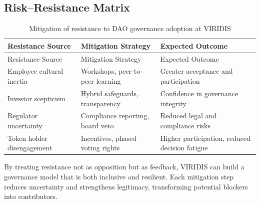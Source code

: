 \documentclass[
  english,
  12pt,
  oneside,
  open=any]{scrbook}
\begin{document}
\subsection{Risk--Resistance Matrix}\label{riskresistance-matrix}

\begin{longtable}[]{@{}
  >{\raggedright\arraybackslash}p{}
  >{\raggedright\arraybackslash}p{}
  >{\raggedright\arraybackslash}p{}@{}}
\caption{Mitigation of resistance to DAO governance adoption at
VIRIDIS}\label{tbl-resistance}\tabularnewline
\toprule\noalign{}
\begin{minipage}[b]{\linewidth}\raggedright
Resistance Source
\end{minipage} & \begin{minipage}[b]{\linewidth}\raggedright
Mitigation Strategy
\end{minipage} & \begin{minipage}[b]{\linewidth}\raggedright
Expected Outcome
\end{minipage} \\
\midrule\noalign{}
\endfirsthead
\toprule\noalign{}
\begin{minipage}[b]{\linewidth}\raggedright
Resistance Source
\end{minipage} & \begin{minipage}[b]{\linewidth}\raggedright
Mitigation Strategy
\end{minipage} & \begin{minipage}[b]{\linewidth}\raggedright
Expected Outcome
\end{minipage} \\
\midrule\noalign{}
\endhead
\bottomrule\noalign{}
\endlastfoot
Employee cultural inertia & Workshops, peer-to-peer learning & Greater
acceptance and participation \\
Investor scepticism & Hybrid safeguards, transparency & Confidence in
governance integrity \\
Regulator uncertainty & Compliance reporting, board veto & Reduced legal
and compliance risks \\
Token holder disengagement & Incentives, phased voting rights & Higher
participation, reduced decision fatigue \\
\end{longtable}

By treating resistance not as opposition but as feedback, VIRIDIS can
build a governance model that is both inclusive and resilient. Each
mitigation step reduces uncertainty and strengthens legitimacy,
transforming potential blockers into contributors.
\end{document}
